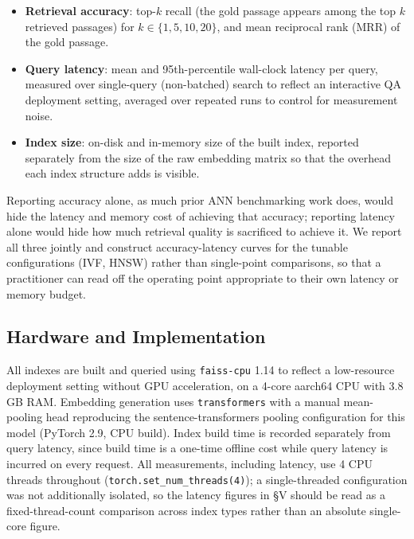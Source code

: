 \documentclass[conference]{IEEEtran}
\begin{document}
\begin{itemize}
\item \textbf{Retrieval accuracy}: top-$k$ recall (the gold passage appears among the top $k$ retrieved passages) for $k \in \{1, 5, 10, 20\}$, and mean reciprocal rank (MRR) of the gold passage.
\item \textbf{Query latency}: mean and 95th-percentile wall-clock latency per query, measured over single-query (non-batched) search to reflect an interactive QA deployment setting, averaged over repeated runs to control for measurement noise.
\item \textbf{Index size}: on-disk and in-memory size of the built index, reported separately from the size of the raw embedding matrix so that the overhead each index structure adds is visible.
\end{itemize}

Reporting accuracy alone, as much prior ANN benchmarking work does, would hide the latency and memory cost of achieving that accuracy; reporting latency alone would hide how much retrieval quality is sacrificed to achieve it. We report all three jointly and construct accuracy-latency curves for the tunable configurations (IVF, HNSW) rather than single-point comparisons, so that a practitioner can read off the operating point appropriate to their own latency or memory budget.

\subsection{Hardware and Implementation}

All indexes are built and queried using \texttt{faiss-cpu} 1.14 to reflect a low-resource deployment setting without GPU acceleration, on a 4-core aarch64 CPU with 3.8\,GB RAM. Embedding generation uses \texttt{transformers} with a manual mean-pooling head reproducing the sentence-transformers pooling configuration for this model (PyTorch 2.9, CPU build). Index build time is recorded separately from query latency, since build time is a one-time offline cost while query latency is incurred on every request. All measurements, including latency, use 4 CPU threads throughout (\texttt{torch.set\_num\_threads(4)}); a single-threaded configuration was not additionally isolated, so the latency figures in \S V should be read as a fixed-thread-count comparison across index types rather than an absolute single-core figure.
\end{document}

